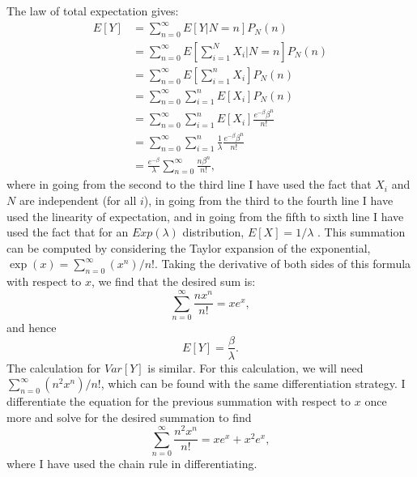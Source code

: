 \begin{problem}{15} The law of total expectation gives:
\begin{align*}
E[Y] &= \sum_{n=0}^\infty E[Y|N=n]P_N(n) \\
& = \sum_{n=0}^\infty E\left [\sum_{i=1}^N X_i|N=n \right ]P_N(n) \\
& = \sum_{n=0}^\infty E\left [\sum_{i=1}^n X_i \right ]P_N(n) \\
& = \sum_{n=0}^\infty  \sum_{i=1}^n E[X_i] P_N(n) \\
& = \sum_{n=0}^\infty  \sum_{i=1}^n E[X_i] \frac{e^{-\beta} \beta^n}{n!} \\
& = \sum_{n=0}^\infty  \sum_{i=1}^n \frac{1}{\lambda} \frac{e^{-\beta} \beta^n}{n!} \\
& =\frac{e^{-\beta}}{\lambda} \sum_{n=0}^\infty \frac{n \beta^n}{n!},
\end{align*}
where in going from the second to the third line I have used the fact that $X_i$ and $N$ are independent (for all $i$), in going from the third to the fourth line I have used the linearity of expectation, and in going from the fifth to sixth line I have used the fact that for an $Exp(\lambda)$ distribution, $E[X] = 1/\lambda$ .  This summation can be computed by considering the Taylor expansion of the exponential, $\exp(x) = \sum_{n=0}^\infty (x^n)/n!$.  Taking the derivative of both sides of this formula with respect to $x$, we find that the desired sum is:
\begin{equation*}
 \sum_{n=0}^\infty \frac{n x^n}{n!} = xe^x,
\end{equation*}
and hence
\begin{equation*}
E[Y] = \frac{\beta}{\lambda}.
\end{equation*} 
The calculation for $Var[Y]$ is similar.  For this calculation, we will need $\sum_{n=0}^\infty (n^2 x^n)/n!$, which can be found with the same differentiation strategy.  I differentiate the equation for the previous summation with respect to $x$ once more and solve for the desired summation to find
\begin{equation*}
 \sum_{n=0}^\infty \frac{n^2 x^n}{n!} = xe^x+x^2e^x,
\end{equation*}
where I have used the chain rule in differentiating.


\end{problem}
